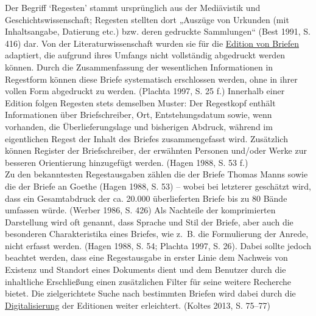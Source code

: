 \documentclass{article}
\begin{document}
    Der Begriff ‘Regesten’ stammt ursprünglich aus der Mediävistik und Geschichtswissenschaft;  Regesten stellten dort „Auszüge von Urkunden (mit Inhaltsangabe, Datierung etc.) bzw. deren gedruckte Sammlungen“ (Best 1991, S. 416) dar. Von der Literaturwissenschaft wurden sie für die \href{http://gams.uni-graz.at/o:konde.39}{Edition von Briefen} adaptiert, die aufgrund ihres Umfangs nicht vollständig abgedruckt werden können. Durch die Zusammenfassung der wesentlichen Informationen in Regestform können diese Briefe systematisch erschlossen werden, ohne in ihrer vollen Form abgedruckt zu werden. (Plachta 1997, S. 25 f.) Innerhalb einer Edition folgen Regesten stets demselben Muster: Der Regestkopf enthält Informationen über Briefschreiber, Ort, Entstehungsdatum sowie, wenn vorhanden, die Überlieferungslage und bisherigen Abdruck, während im eigentlichen Regest der Inhalt des Briefes zusammengefasst wird. Zusätzlich können Register der Briefschreiber, der erwähnten Personen und/oder Werke zur besseren Orientierung hinzugefügt werden. (Hagen 1988, S. 53 f.)\\
            
        Zu den bekanntesten Regestausgaben zählen die der Briefe Thomas Manns sowie die der Briefe an Goethe (Hagen 1988, S. 53) – wobei bei letzterer geschätzt wird, dass ein Gesamtabdruck der ca. 20.000 überlieferten Briefe bis zu 80 Bände umfassen würde. (Werber 1986, S. 426) Als Nachteile der komprimierten Darstellung wird oft genannt, dass Sprache und Stil der Briefe, aber auch die besonderen Charakteristika eines Briefes, wie z. B. die Formulierung der Anrede, nicht erfasst werden. (Hagen 1988, S. 54; Plachta 1997, S. 26). Dabei sollte jedoch beachtet werden, dass eine Regestausgabe in erster Linie dem Nachweis von Existenz und Standort eines Dokuments dient und dem Benutzer durch die inhaltliche Erschließung einen zusätzlichen Filter für seine weitere Recherche bietet. Die zielgerichtete Suche nach bestimmten Briefen wird dabei durch die \href{http://gams.uni-graz.at/o:konde.60}{Digitalisierung} der Editionen weiter erleichtert. (Koltes 2013, S. 75–77)\\
            
\end{document}
